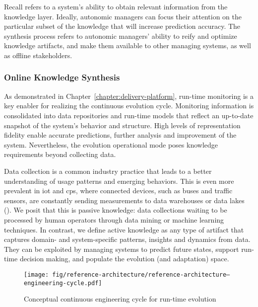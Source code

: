 \begin{description}[style=unboxed,leftmargin=0cm,font=\bfseries\normalsize]
	\item[Recall and Synthesis\autodot] Recall refers to a system's ability to obtain relevant information from the knowledge layer. Ideally, autonomic managers can focus their attention on the particular subset of the knowledge that will increase prediction accuracy. The synthesis process refers to autonomic managers' ability to reify and optimize knowledge artifacts, and make them available to other managing systems, as well as offline stakeholders.
\end{description}

\subsubsection{Online Knowledge Synthesis}
\label{subsect:reference-architecture--online-knowledge-synthesis}

As demonstrated in Chapter~\ref{chapter:delivery-platform}, run-time monitoring is a key enabler for realizing the continuous evolution cycle. Monitoring information is consolidated into data repositories and run-time models that reflect an up-to-date snapshot of the system's behavior and structure. High levels of representation fidelity enable accurate predictions, further analysis and improvement of the system. Nevertheless, the evolution operational mode poses knowledge requirements beyond collecting data.

Data collection is a common industry practice that leads to a better understanding of usage patterns and emerging behaviors. This is even more prevalent in \gls{iot} and \gls{cps}, where connected devices, such as buses and traffic sensors, are constantly sending measurements to data warehouses or data lakes (). We posit that this is passive knowledge: data collections waiting to be processed by human operators through data mining or machine learning techniques. In contrast, we define active knowledge as any type of artifact that captures domain- and system-specific patterns, insights and dynamics from data. They can be exploited by managing systems to predict future states, support run-time decision making, and populate the evolution (and adaptation) space.

\begin{figure}[h]
	\centering
	\texttt{[image: fig/reference-architecture/reference-architecture--engineering-cycle.pdf]}
	\caption{Conceptual continuous engineering cycle for run-time evolution}
	\label{fig:reference-architecture--continuous-engineering-cycle}
\end{figure}

